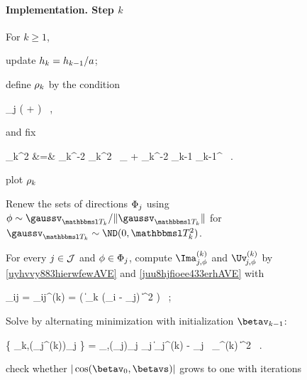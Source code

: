 \paragraph{Implementation. Step \( k \)}
For \( k \geq 1 \), 
\begin{mylist}

\item 
update \( h_{k} = h_{k-1} / a \);
\item 
define \( \rho_{k} \) by the condition
\begin{EQA}[c]
	 \sum_{j \in \JJJ} \sumi 
		\Kern\Bigl( 
		+  
	\Bigr)
	\geq 
	\nmin
	\, ,
\label{jhgiverkytde4w34etyAVE}
\end{EQA}
and fix 
\begin{EQA}[rcl]
	\TEDR_{k}^{2}
	&=&
	\hiso_{k}^{-2} \aniso_{k}^{2} \, \Id_{\dimd} + \hiso_{k}^{-2} \betav_{k-1} \betav_{k-1}^{\T}
	\, .
\label{iufhvu8kjbmnll475eAVE}
\end{EQA}

{\color{blue} plot \( \rho_{k} \)}
\item
Renew the sets of directions \( \Phi_{j} \) using 
\( \sph \sim \gaussv_{\TEDR_{k}}/\| \gaussv_{\TEDR_{k}} \| \) for \( \gaussv_{\TEDR_{k}} \sim \ND(0,\TEDR_{k}^{2}) \).

\item 
For every \( j \in \mathcal{J} \) and \( \phi \in \Phi_{j} \), compute \( \Ima_{j,\sph}^{(k)} \) and \( \Uv_{\jm,\sph}^{(k)} \) by \eqref{uyhvvy883hierwfewAVE} and \eqref{juu8hjfioee433erhAVE} 
with 
\begin{EQA}[c]
	\weight_{ij} 
	= 
	\weight_{ij}^{(k)}
	= 
	\Kern\bigl( \| \TEDR_{k} (\Xv_{i} - \xv_{j}) \|^{2} \bigr) 
	\, ;
\end{EQA}

\item 
Solve by alternating minimization with initialization \( \betav_{k-1} \):
\begin{EQA}[c]
	\{ \betav_{k},(\fcl_{j}^{(k)})_{j \in \JJJ} \} 
	=
	\arginf_{\betav,(\fcl_{j})_{j \in \JJJ}} 
	\sum_{j \in \JJJ} \bigl\| \Imav_{j}^{(k)} - \fcl_{j} \, \UV_{\jm}^{(k)} \betav \bigr\|^{2}
	\, .
\end{EQA}

{\color{blue} check whether \( |\cos(\betav_{0},\betavs)| \) grows to one with iterations}

\end{mylist}


